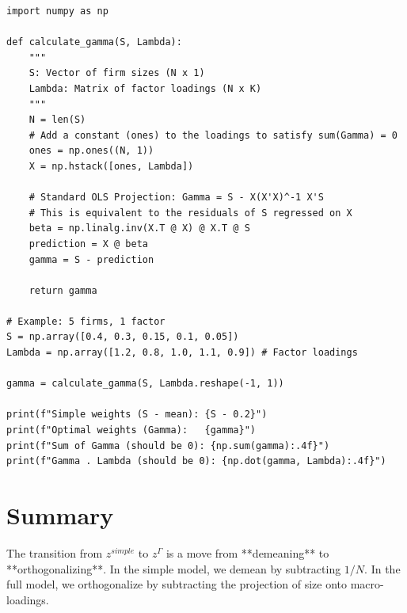 \documentclass[11pt]{article}
\begin{document}
\begin{lstlisting}
import numpy as np

def calculate_gamma(S, Lambda):
    """
    S: Vector of firm sizes (N x 1)
    Lambda: Matrix of factor loadings (N x K)
    """
    N = len(S)
    # Add a constant (ones) to the loadings to satisfy sum(Gamma) = 0
    ones = np.ones((N, 1))
    X = np.hstack([ones, Lambda])
    
    # Standard OLS Projection: Gamma = S - X(X'X)^-1 X'S
    # This is equivalent to the residuals of S regressed on X
    beta = np.linalg.inv(X.T @ X) @ X.T @ S
    prediction = X @ beta
    gamma = S - prediction
    
    return gamma

# Example: 5 firms, 1 factor
S = np.array([0.4, 0.3, 0.15, 0.1, 0.05])
Lambda = np.array([1.2, 0.8, 1.0, 1.1, 0.9]) # Factor loadings

gamma = calculate_gamma(S, Lambda.reshape(-1, 1))

print(f"Simple weights (S - mean): {S - 0.2}")
print(f"Optimal weights (Gamma):   {gamma}")
print(f"Sum of Gamma (should be 0): {np.sum(gamma):.4f}")
print(f"Gamma . Lambda (should be 0): {np.dot(gamma, Lambda):.4f}")
\end{lstlisting}

\section{Summary}
The transition from $z^{simple}$ to $z^{\Gamma}$ is a move from **demeaning** to **orthogonalizing**. In the simple model, we demean by subtracting $1/N$. In the full model, we orthogonalize by subtracting the projection of size onto macro-loadings.
\end{document}
